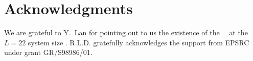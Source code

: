 
\section*{Acknowledgments}

We are grateful to Y.~Lan for pointing out to us the existence of
the  ~\eqv\ at the $L=22$ system size .
R.L.D. gratefully acknowledges the support from EPSRC under grant GR/S98986/01.
